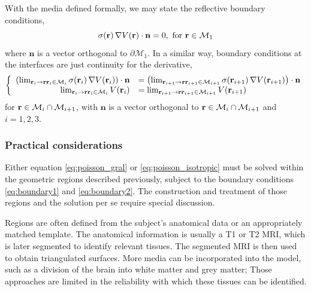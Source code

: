 With the media defined formally, we may state the reflective boundary conditions,
\begin{equation}
\sigma(\mathbf{r})\, \nabla V(\mathbf{r}) \cdot \mathbf{n} = 0, 
\text{ for } \mathbf{r} \in \mathcal{M}_1
\label{eq:boundary1}
\end{equation}
where $\mathbf{n}$ is a vector orthogonal to $\partial\mathcal{M}_1$.
%
In a similar way, boundary conditions at the interfaces are just continuity for the derivative,
\begin{equation}
\left\{
\begin{array}{rl}
\left( \lim_{
\mathbf{r}_i\rightarrow \mathbf{r} 
\mathbf{r}_i\in \mathcal{M}_i
}
\sigma(\mathbf{r}_i)
\, 
\nabla 
V(\mathbf{r}_i)
 \right) 
\cdot 
\mathbf{n}
&=
\left( \lim_{\mathbf{r}_{i+1}\rightarrow \mathbf{r} \mathbf{r}_{i+1}\in \mathcal{M}_{i+1}}
\sigma(\mathbf{r}_{i+1})\, \nabla V(\mathbf{r}_{i+1}) \right) \cdot \mathbf{n} 
\\
{\lim_{\mathbf{r}_i\rightarrow \mathbf{r} \mathbf{r}_i\in \mathcal{M}_i}
V(\mathbf{r}_i)} 
&=
{\lim_{\mathbf{r}_{i+1}\rightarrow \mathbf{r} \mathbf{r}_{i+1}\in \mathcal{M}_{i+1}}
V(\mathbf{r}_{i+1})} 
\end{array}
\right.
\label{eq:boundary2}
\end{equation}
for $\mathbf{r} \in \mathcal{M}_i \cap \mathcal{M}_{i+1}$, 
with 
$\mathbf{n}$ is a vector orthogonal to
$\mathbf{r} \in \mathcal{M}_i \cap \mathcal{M}_{i+1}$
and
$i = 1, 2, 3$.

\subsubsection{Practical considerations}

Either equation \eqref{eq:poisson_gral} or \eqref{eq:poisson_isotropic} must be solved within the geometric regions described previously, subject to the boundary conditions \eqref{eq:boundary1} and \eqref{eq:boundary2}.
%
The construction and treatment of those regions and the solution per se require special discussion.

Regions are often defined from the subject's anatomical data or an appropriately matched template.
%
The anatomical information is usually a T1 or T2 MRI, which is later segmented to identify relevant tissues. The segmented MRI is then used to obtain triangulated surfaces. 
%
More media can be incorporated into the model, such as a division of the brain into white matter and grey matter;
Those approaches are limited in the reliability with which these tissues can be identified.

